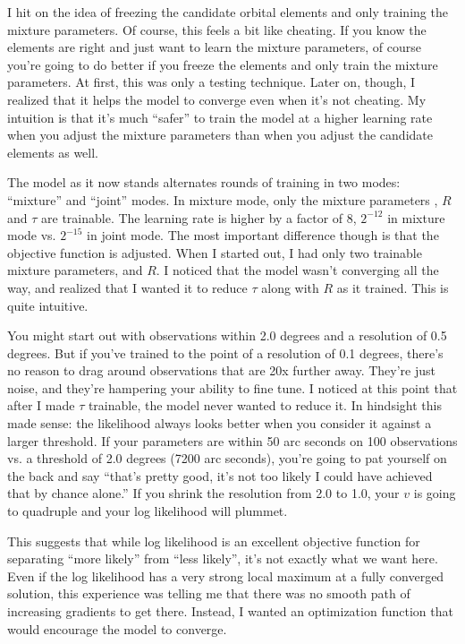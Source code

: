I hit on the idea of freezing the candidate orbital elements and only training the mixture parameters.
Of course, this feels a bit like cheating.  
If you know the elements are right and just want to learn the mixture parameters, 
of course you're going to do better if you freeze the elements and only train the mixture parameters.
At first, this was only a testing technique.
Later on, though, I realized that it helps the model to converge even when it's not cheating.
My intuition is that it's much ``safer'' to train the model at a higher learning rate when you adjust 
the mixture parameters than when you adjust the candidate elements as well.

The model as it now stands alternates rounds of training in two modes: ``mixture'' and ``joint'' modes.
In mixture mode, only the mixture parameters , $R$ and $\tau$ are trainable.
The learning rate is higher by a factor of 8, $2^{-12}$ in mixture mode vs. $2^{-15}$ in joint mode.
The most important difference though is that the objective function is adjusted.
When I started out, I had only two trainable mixture parameters,  and $R$.
I noticed that the model wasn't converging all the way, and realized that I wanted it to reduce $\tau$ along with $R$ as it trained.
This is quite intuitive.  

You might start out with observations within 2.0 degrees and a resolution of 0.5 degrees.
But if you've trained to the point of a resolution of 0.1 degrees, there's no reason to drag around observations that are 20x further away.
They're just noise, and they're hampering your ability to fine tune.
I noticed at this point that after I made $\tau$ trainable, the model never wanted to reduce it.
In hindsight this made sense: the likelihood always looks better when you consider it against a larger threshold.
If your parameters are within 50 arc seconds on 100 observations vs. a threshold of 2.0 degrees (7200 arc seconds), 
you're going to pat yourself on the back and say ``that's pretty good, it's not too likely I could have achieved that by chance alone.''
If you shrink the resolution from 2.0 to 1.0, your $v$ is going to quadruple and your log likelihood will plummet.

This suggests that while log likelihood is an excellent objective function for separating ``more likely'' from ``less likely'', it's not exactly what we want here.
Even if the log likelihood has a very strong local maximum at a fully converged solution,
this experience was telling me that there was no smooth path of increasing gradients to get there.
Instead, I wanted an optimization function that would encourage the model to converge.

